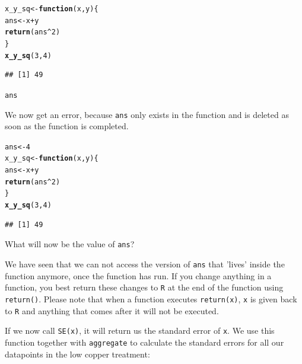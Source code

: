 \documentclass[12pt,a4paper]{article}\usepackage[]{graphicx}\usepackage[]{color}
\makeatletter
\newcommand{\hlnum}[1]{\textcolor[rgb]{0.686,0.059,0.569}{#1}}%
\newcommand{\hlopt}[1]{\textcolor[rgb]{0,0,0}{#1}}%
\newcommand{\hlstd}[1]{\textcolor[rgb]{0.345,0.345,0.345}{#1}}%
\newcommand{\hlkwa}[1]{\textcolor[rgb]{0.161,0.373,0.58}{\textbf{#1}}}%
\newcommand{\hlkwb}[1]{\textcolor[rgb]{0.69,0.353,0.396}{#1}}%
\newcommand{\hlkwc}[1]{\textcolor[rgb]{0.333,0.667,0.333}{#1}}%
\newcommand{\hlkwd}[1]{\textcolor[rgb]{0.737,0.353,0.396}{\textbf{#1}}}%
\newenvironment{kframe}{%
 \def\at@end@of@kframe{}%
 \ifinner\ifhmode%
  \def\at@end@of@kframe{\end{minipage}}%
  \begin{minipage}{\columnwidth}%
 \fi\fi%
 \def\FrameCommand##1{\hskip\@totalleftmargin \hskip-\fboxsep
 \colorbox{shadecolor}{##1}\hskip-\fboxsep
     \hskip-\linewidth \hskip-\@totalleftmargin \hskip\columnwidth}%
 \MakeFramed {\advance\hsize-\width
   \@totalleftmargin\z@ \linewidth\hsize
   \@setminipage}}%
 {\par\unskip\endMakeFramed%
 \at@end@of@kframe}
\newenvironment{knitrout}{}{} %
\makeatother
\begin{document}
\begin{mdframed}
\begin{knitrout}
\color{fgcolor}\begin{kframe}
\begin{alltt}
\hlstd{x_y_sq} \hlkwb{<-} \hlkwa{function}\hlstd{(}\hlkwc{x}\hlstd{,}\hlkwc{y}\hlstd{)\{}
  \hlstd{ans} \hlkwb{<-} \hlstd{x} \hlopt{+} \hlstd{y}
  \hlkwd{return}\hlstd{(ans}\hlopt{^}\hlnum{2}\hlstd{)}
\hlstd{\}}
\hlkwd{x_y_sq}\hlstd{(}\hlnum{3}\hlstd{,} \hlnum{4}\hlstd{)}
\end{alltt}
\begin{verbatim}
## [1] 49
\end{verbatim}
\begin{alltt}
\hlstd{ans}
\end{alltt}


{\ttfamily\noindent\bfseries\color{errorcolor}{\#\# Error in eval(expr, envir, enclos): object 'ans' not found}}\end{kframe}
\end{knitrout}
We now get an error, because \texttt{ans} only exists in the function and is deleted as soon as the function is completed. 
\begin{knitrout}
\color{fgcolor}\begin{kframe}
\begin{alltt}
\hlstd{ans} \hlkwb{<-} \hlnum{4}
\hlstd{x_y_sq} \hlkwb{<-} \hlkwa{function}\hlstd{(}\hlkwc{x}\hlstd{,}\hlkwc{y}\hlstd{)\{}
  \hlstd{ans} \hlkwb{<-} \hlstd{x} \hlopt{+} \hlstd{y}
  \hlkwd{return}\hlstd{(ans}\hlopt{^}\hlnum{2}\hlstd{)}
\hlstd{\}}
\hlkwd{x_y_sq}\hlstd{(}\hlnum{3}\hlstd{,} \hlnum{4}\hlstd{)}
\end{alltt}
\begin{verbatim}
## [1] 49
\end{verbatim}
\end{kframe}
\end{knitrout}
What will now be the value of \texttt{ans}?

We have seen that we can not access the version of \texttt{ans} that 'lives' inside the function anymore, once the function has run. If you change anything in a function, you best return these changes to \texttt{R} at the end of the function using \texttt{return()}. Please note that when a function executes \texttt{return(x)}, \texttt{x} is given back to \texttt{R} and anything that comes after it will not be executed.
\end{mdframed}
If we now call \texttt{SE(x)}, it will return us the standard error of \texttt{x}. We use this function together with \texttt{aggregate} to calculate the standard errors for all our datapoints in the low copper treatment:
\end{document}
